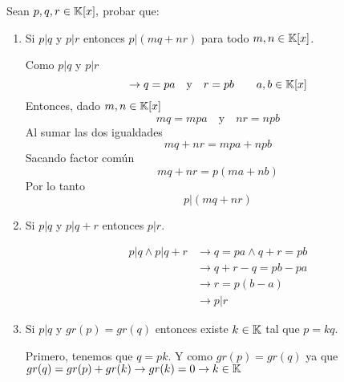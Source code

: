 \item Sean $p,q,r\in\mathbb{K}[x],$ probar que:
    \begin{enumerate}
        \item Si $p|q$ y $p|r$ entonces $p|(mq+nr)$ para todo $m,n\in\mathbb{K}[x]$.
            \begin{mdframed}[style=s]
                Como $p|q$ y $p|r$\[\to q=pa\quad\text{y}\quad r=pb\qquad a,b\in\mathbb{K}[x]\]
                Entonces, dado $m,n\in\mathbb{K}[x]$\[mq=mpa\quad\text{y}\quad nr=npb\]
                Al sumar las dos igualdades\[mq+nr=mpa+npb\]
                Sacando factor común\[mq+nr=p(ma+nb)\]
                Por lo tanto\[p|(mq+nr)\]
            \end{mdframed}
        \item Si $p|q$ y $p|q+r$ entonces $p|r$.
            \begin{mdframed}[style=s]
                \begin{align*}
                    p|q\land p|q+r&\to q=pa\land q+r=pb\\
                    &\to q+r-q=pb-pa\\
                    &\to r=p(b-a)\\
                    &\to p|r
                \end{align*}
            \end{mdframed}
        \item Si $p|q$ y $gr(p)=gr(q)$ entonces existe $k\in\mathbb{K}$ tal que $p=kq$.
            \begin{mdframed}[style=s]
                Primero, tenemos que $q=pk$. Y como $gr(p)=gr(q)$ ya que $gr(q)=gr(p)+gr(k)\to gr(k)=0\to k\in\mathbb{K}$
            \end{mdframed}
    \end{enumerate}
    